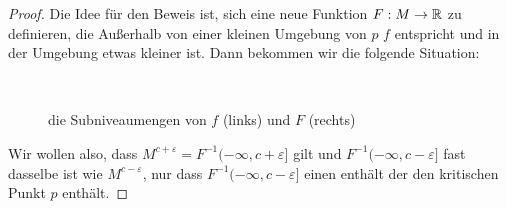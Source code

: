 \begin{proof}
    Die Idee für den Beweis ist, sich eine neue Funktion $F: M \to { \mathbb R }$ zu definieren,
    die Außerhalb von einer kleinen Umgebung von $p$ $f$ entspricht und in der 
    Umgebung etwas kleiner ist. Dann bekommen wir die folgende Situation:

    \begin{figure}[H]
        \centering
         \\
        \caption{die Subniveaumengen von $f$ (links) und $F$ (rechts)}
    \end{figure}

    Wir wollen also, dass $M^{c + \varepsilon} = F^{-1}(- \infty, c + \varepsilon]$ 
    gilt und $F^{-1}(-\infty, c - \varepsilon]$ fast dasselbe ist wie 
    $M^{c - \varepsilon}$, nur dass $F^{-1}(-\infty, c - \varepsilon]$ einen 
    enthält der den kritischen Punkt $p$ enthält.


\end{proof}
